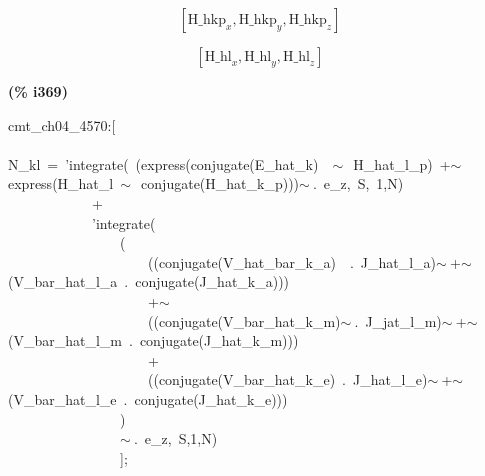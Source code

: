 \documentclass[fleqn]{article}
\begin{document}
\[\tag{\% o367} 
\left[ {{\ensuremath{\mathrm{H\_ hkp}}}_x}\operatorname{,}{{\ensuremath{\mathrm{H\_ hkp}}}_y}\operatorname{,}{{\ensuremath{\mathrm{H\_ hkp}}}_z}\right] \mbox{}\]

\[\tag{\% o368} 
\left[ {{\ensuremath{\mathrm{H\_ hl}}}_x}\operatorname{,}{{\ensuremath{\mathrm{H\_ hl}}}_y}\operatorname{,}{{\ensuremath{\mathrm{H\_ hl}}}_z}\right] \mbox{}
\]


\noindent
\begin{minipage}[t]{4.000000em}\color{red}\bfseries
(\% i369)	
\end{minipage}
\begin{minipage}[t]{\textwidth}\color{blue}
cmt\_ch04\_4570:[\\
\\
N\_kl\ =\ 'integrate(\ (express(conjugate(E\_hat\_k)\ \ \ensuremath{\sim\ }\ H\_hat\_l\_p)\ +\ensuremath{\sim\ }express(H\_hat\_l\ \ensuremath{\sim\ }\ conjugate(H\_hat\_k\_p)))\ensuremath{\sim\ }.\ e\_z,\ S,\ 1,N)\\
\ \ \ \ \ \ \ \ \ \ \ \ +\\
\ \ \ \ \ \ \ \ \ \ \ \ 'integrate(\ \\
\ \ \ \ \ \ \ \ \ \ \ \ \ \ \ \ (\ \\
\ \ \ \ \ \ \ \ \ \ \ \ \ \ \ \ \ \ \ \ ((conjugate(V\_hat\_bar\_k\_a)\ \ .\ J\_hat\_l\_a)\ensuremath{\sim\ }+\ensuremath{\sim\ }(V\_bar\_hat\_l\_a\ .\ conjugate(J\_hat\_k\_a)))\\
\ \ \ \ \ \ \ \ \ \ \ \ \ \ \ \ \ \ \ \ +\ensuremath{\sim\ }\\
\ \ \ \ \ \ \ \ \ \ \ \ \ \ \ \ \ \ \ \ ((conjugate(V\_bar\_hat\_k\_m)\ensuremath{\sim\ }.\ J\_jat\_l\_m)\ensuremath{\sim\ }+\ensuremath{\sim\ }(V\_bar\_hat\_l\_m\ .\ conjugate(J\_hat\_k\_m)))\\
\ \ \ \ \ \ \ \ \ \ \ \ \ \ \ \ \ \ \ \ +\\
\ \ \ \ \ \ \ \ \ \ \ \ \ \ \ \ \ \ \ \ ((conjugate(V\_bar\_hat\_k\_e)\ .\ J\_hat\_l\_e)\ensuremath{\sim\ }+\ensuremath{\sim\ }(V\_bar\_hat\_l\_e\ .\ conjugate(J\_hat\_k\_e)))\\
\ \ \ \ \ \ \ \ \ \ \ \ \ \ \ \ )\\
\ \ \ \ \ \ \ \ \ \ \ \ \ \ \ \ \ensuremath{\sim\ }.\ e\_z,\ S,1,N)\\
\ \ \ \ \ \ \ \ \ \ \ \ \ \ \ \ ];
\end{minipage}
\end{document}
